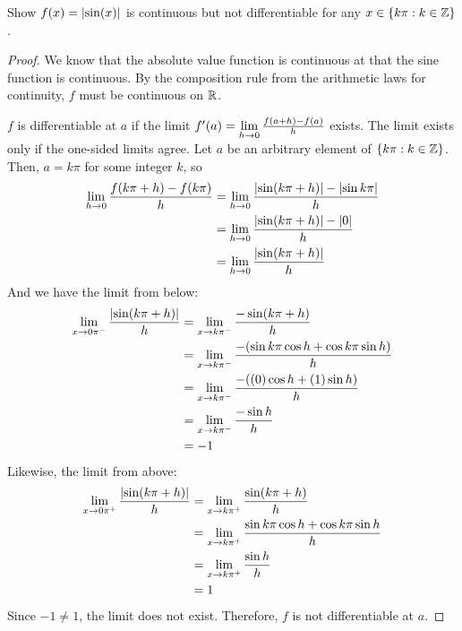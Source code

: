 \documentclass{agony}
\begin{document}
\question Show $f(x) = \abs{\sin(x)}$ is continuous but not differentiable for any $x \in \{k\pi : k \in \mathbb{Z}\}$.
\begin{proof}
  We know that the absolute value function is continuous at that the sine function is continuous.
  By the composition rule from the arithmetic laws for continuity, $f$ must be continuous on $\mathbb{R}$.

  $f$ is differentiable at $a$ if the limit $f'(a)=\lim\limits_{h\to0}\frac{f(a+h)-f(a)}{h}$ exists.
  The limit exists only if the one-sided limits agree.
  Let $a$ be an arbitrary element of $\{k\pi : k \in \mathbb{Z}\}$.
  Then, $a=k\pi$ for some integer $k$, so
  \begin{align*}
    \lim\limits_{h\to0} \frac{f(k\pi+h)-f(k\pi)}{h}
     & = \lim\limits_{h\to0} \frac{\abs{\sin(k\pi+h)}-\abs{\sin k\pi}}{h} \\
     & = \lim\limits_{h\to0} \frac{\abs{\sin(k\pi+h)}-\abs{0}}{h}         \\
     & = \lim\limits_{h\to0} \frac{\abs{\sin(k\pi+h)}}{h}
  \end{align*}
  And we have the limit from below:
  \begin{align*}
    \lim\limits_{x\to0\pi^-} \frac{\abs{\sin(k\pi+h)}}{h}
     & = \lim\limits_{x\to k\pi^-} \frac{-\sin(k\pi+h)}{h}                          \\
     & = \lim\limits_{x\to k\pi^-} \frac{-(\sin k\pi \cos h + \cos k\pi \sin h)}{h} \\
     & = \lim\limits_{x\to k\pi^-} \frac{-((0)\cos h + (1)\sin h)}{h}               \\
     & = \lim\limits_{x\to k\pi^-} \frac{-\sin h}{h}                                \\
     & = -1
  \end{align*}
  Likewise, the limit from above:
  \begin{align*}
    \lim\limits_{x\to0\pi^+} \frac{\abs{\sin(k\pi+h)}}{h}
     & = \lim\limits_{x\to k\pi^+} \frac{\sin(k\pi+h)}{h}                        \\
     & = \lim\limits_{x\to k\pi^+} \frac{\sin k\pi \cos h + \cos k\pi \sin h}{h} \\
     & = \lim\limits_{x\to k\pi^+} \frac{\sin h}{h}                              \\
     & = 1
  \end{align*}
  Since $-1 \neq 1$, the limit does not exist.
  Therefore, $f$ is not differentiable at $a$.
\end{proof}
\end{document}
